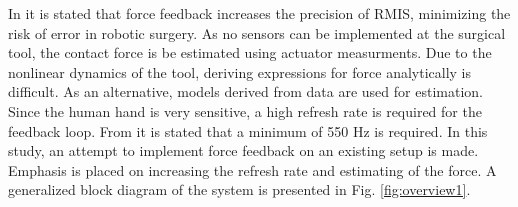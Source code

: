 




\vspace{5mm}

In \cite{RIGSP} it is stated that force feedback increases the precision of RMIS, minimizing the risk of error in robotic surgery.  As no sensors can be implemented at the surgical tool, the contact force is be estimated using actuator measurments. 
Due to the nonlinear dynamics of the tool, deriving expressions for force analytically is difficult.
As an alternative,  models derived from data are used for estimation.
Since the human hand is very sensitive, a high refresh rate is required for the feedback loop.
From \cite{coles2011role} it is stated that a minimum of 550 Hz is required. 
\vspace{5mm}
In this study, an attempt to implement force feedback on an existing setup is made. Emphasis is placed on increasing the refresh rate and estimating of the force. A generalized block diagram of the system is presented in Fig. \ref{fig:overview1}.

%

